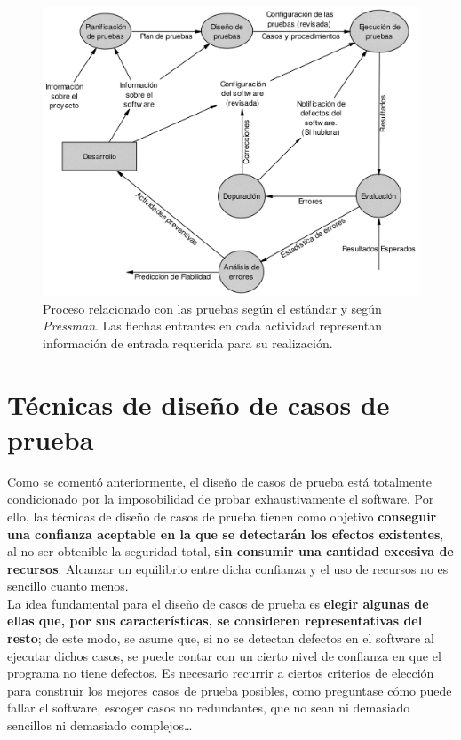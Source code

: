 \begin{figure}[H]
    \centering
    \includegraphics[width=0.8\linewidth]{Resources/Tema6/ProcesoPruebas_IEEE_Pressman.png}
    \caption{Proceso relacionado con las pruebas según el estándar y según \textit{Pressman}. Las flechas entrantes en cada actividad representan información de entrada requerida para su realización.}
\end{figure}


\section{Técnicas de diseño de casos de prueba}

Como se comentó anteriormente, el diseño de casos de prueba está totalmente condicionado por la imposobilidad de probar exhaustivamente el software. Por ello, las técnicas de diseño de casos de prueba tienen como objetivo \textbf{conseguir una confianza aceptable en la que se detectarán los efectos existentes}, al no ser obtenible la seguridad total, \textbf{sin consumir una cantidad excesiva de recursos}. Alcanzar un equilibrio entre dicha confianza y el uso de recursos no es sencillo cuanto menos.\\

La idea fundamental para el diseño de casos de prueba es \textbf{elegir algunas de ellas que, por sus características, se consideren representativas del resto}; de este modo, se asume que, si no se detectan defectos en el software al ejecutar dichos casos, se puede contar con un cierto nivel de confianza en que el programa no tiene defectos. Es necesario recurrir a ciertos criterios de elección para construir los mejores casos de prueba posibles, como preguntase cómo puede fallar el software, escoger casos no redundantes, que no sean ni demasiado sencillos ni demasiado complejos\ldots\\

